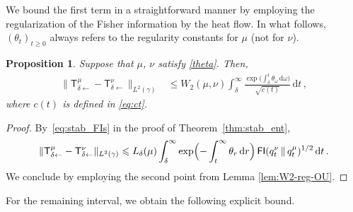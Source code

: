 \documentclass[12pt]{article}
\newcommand{\1}{\mathds{1}}
\newcommand*{\rd}{\mathrm{d}}
\newcommand*{\dd}{\, \rd}
\newcommand{\mmid}{\,\Vert\,}
\DeclareMathOperator*{\FI}{\mathsf{FI}}
\renewcommand{\ge}{\geqslant}
\renewcommand{\leq}{\leqslant}
\newcommand{\KM}{\mathsf T}
\theoremstyle{plain}
\newtheorem{proposition}[theorem]{Proposition}
\theoremstyle{definition}
\theoremstyle{remark}
\begin{document}
We bound the first term in a straightforward manner by employing the regularization of the Fisher information by the heat flow.
In what follows, $(\theta_t)_{t\ge 0}$ always refers to the regularity constants for $\mu$ (not for $\nu$).

\begin{proposition}\label{prop:ineq_1}
Suppose that $\mu$, $\nu$ satisfy \eqref{theta}.
Then,
\begin{align*}
    \|\KM^\mu_{\delta\gets} - \KM^\nu_{\delta\gets}\|_{L^2(\gamma)}
    &\leq W_2(\mu,\nu)\int_\delta^\infty \frac{\exp\bigl(\textstyle \int_\delta^t \theta_\omega \dd \omega\bigr)}{\sqrt{c(t)}}\dd t\,,
\end{align*}
where $c(t)$ is defined in \eqref{eq:ct}.
\end{proposition}
\begin{proof}
By~\eqref{eq:stab_FIs} in the proof of Theorem~\ref{thm:stab_ent},
\begin{align*}
     \|\mathsf T_{\delta\gets}^{\mu} - \mathsf T_{\delta\gets}^{\nu}\|_{L^2(\gamma)} \leq L_\delta(\mu) \int_\delta^\infty \exp\Bigl(-\int_t^\infty \theta_{r}\dd r\Bigr) \FI(q^\nu_{t}\mmid q^\mu_{t})^{1/2}\dd t \,.
\end{align*}
We conclude by employing the second point from Lemma \ref{lem:W2-reg-OU}.
\end{proof}

For the remaining interval, we obtain the following explicit bound.
\end{document}
